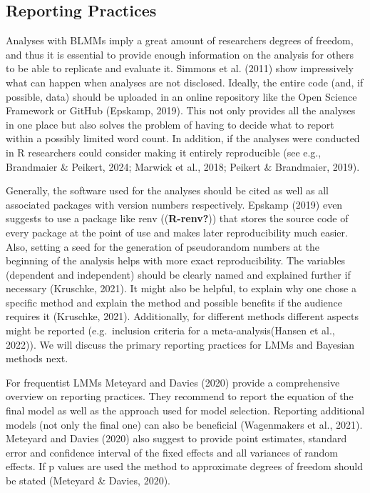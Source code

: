 \documentclass[
  doc,12pt,floatsintext]{apa7}
\begin{document}
\subsection{Reporting Practices}\label{reporting-practices}

Analyses with BLMMs imply a great amount of researchers degrees of freedom, and thus it is essential to provide enough information on the analysis for others to be able to replicate and evaluate it. Simmons et al. (2011) show impressively what can happen when analyses are not disclosed. Ideally, the entire code (and, if possible, data) should be uploaded in an online repository like the Open Science Framework or GitHub (Epskamp, 2019). This not only provides all the analyses in one place but also solves the problem of having to decide what to report within a possibly limited word count. In addition, if the analyses were conducted in R researchers could consider making it entirely reproducible (see e.g., Brandmaier \& Peikert, 2024; Marwick et al., 2018; Peikert \& Brandmaier, 2019).

Generally, the software used for the analyses should be cited as well as all associated packages with version numbers respectively. Epskamp (2019) even suggests to use a package like renv ((\textbf{R-renv?})) that stores the source code of every package at the point of use and makes later reproducibility much easier. Also, setting a seed for the generation of pseudorandom numbers at the beginning of the analysis helps with more exact reproducibility. The variables (dependent and independent) should be clearly named and explained further if necessary (Kruschke, 2021). It might also be helpful, to explain why one chose a specific method and explain the method and possible benefits if the audience requires it (Kruschke, 2021). Additionally, for different methods different aspects might be reported (e.g.~inclusion criteria for a meta-analysis(Hansen et al., 2022)). We will discuss the primary reporting practices for LMMs and Bayesian methods next.

For frequentist LMMs Meteyard and Davies (2020) provide a comprehensive overview on reporting practices. They recommend to report the equation of the final model as well as the approach used for model selection. Reporting additional models (not only the final one) can also be beneficial (Wagenmakers et al., 2021). Meteyard and Davies (2020) also suggest to provide point estimates, standard error and confidence interval of the fixed effects and all variances of random effects. If p values are used the method to approximate degrees of freedom should be stated (Meteyard \& Davies, 2020).
\end{document}
